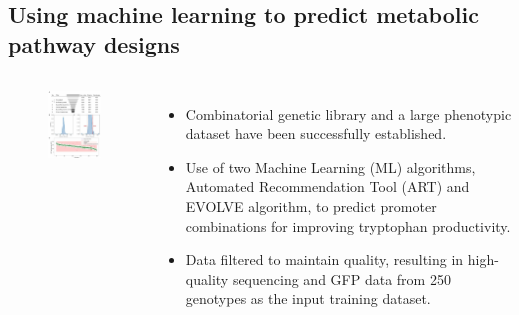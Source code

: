 \documentclass{beamer}
\begin{document}
\subsection{Using machine learning to predict metabolic pathway designs}


\begin{frame}{}
		\begin{columns}
	    \begin{figure}
		\flushleft
		\includegraphics[width=5cm]{pic/图片16.pdf} 
 	    \end{figure}
    \begin{itemize} [<+-| alert@+>] %
        \item\scriptsize Combinatorial genetic library and a large phenotypic dataset have been successfully established.
        \item\scriptsize Use of two Machine Learning (ML) algorithms, Automated Recommendation Tool (ART) and EVOLVE algorithm, to predict promoter combinations for improving tryptophan productivity.
        \item\scriptsize Data filtered to maintain quality, resulting in high-quality sequencing and GFP data from 250 genotypes as the input training dataset.
        
    \end{itemize}          
        \end{columns}

\end{frame}
\end{document}
